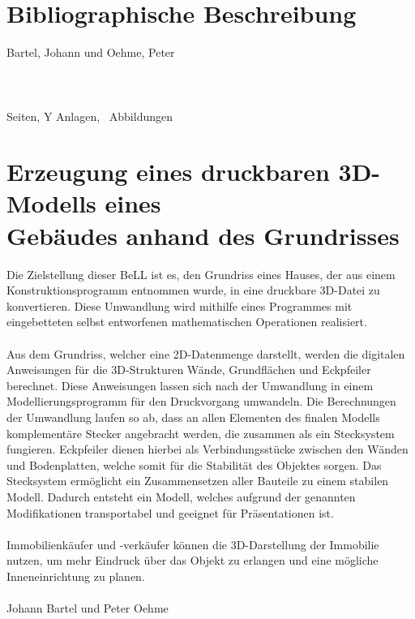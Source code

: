 \section*{Bibliographische Beschreibung}
Bartel, Johann und Oehme, Peter\\\\
\q{\docTitle}\\\\
 \pageref{LastPage} Seiten, Y Anlagen, \totalfigures\ Abbildungen
 
  \newpage
 
\section*{Erzeugung eines druckbaren 3D-Modells eines \\ Gebäudes anhand des Grundrisses}
 	
 
 Die Zielstellung dieser BeLL ist es, den Grundriss eines Hauses, der aus einem Konstruktionsprogramm entnommen wurde, in eine druckbare 3D-Datei zu konvertieren.
 Diese Umwandlung wird mithilfe eines Programmes mit eingebetteten selbst entworfenen mathematischen Operationen realisiert.\\\\
 Aus dem Grundriss, welcher eine 2D-Datenmenge darstellt, werden die digitalen Anweisungen für die 3D-Strukturen Wände, Grundflächen und \mbox{Eckpfeiler} berechnet. 
 Diese Anweisungen lassen sich nach der Umwandlung in einem Modellierungsprogramm für den Druckvorgang umwandeln.
 Die Berechnungen der Umwandlung laufen so ab, dass an allen Elementen des finalen Modells komplementäre Stecker angebracht werden, die zusammen als ein Stecksystem fungieren. 
 Eckpfeiler dienen hierbei als Verbindungsstücke zwischen den Wänden und Bodenplatten, welche somit für die Stabilität des Objektes  sorgen. 
 Das Stecksystem ermöglicht ein Zusammensetzen aller Bauteile zu einem stabilen Modell. 
 Dadurch entsteht ein Modell, welches aufgrund der genannten Modifikationen transportabel und geeignet für Präsentationen ist.\\\\
 Immobilienkäufer und -verkäufer können die 3D-Darstellung der Immobilie  nutzen, um mehr Eindruck über das Objekt zu erlangen und eine mögliche Inneneinrichtung zu planen.\\\\
 Johann Bartel und Peter Oehme
